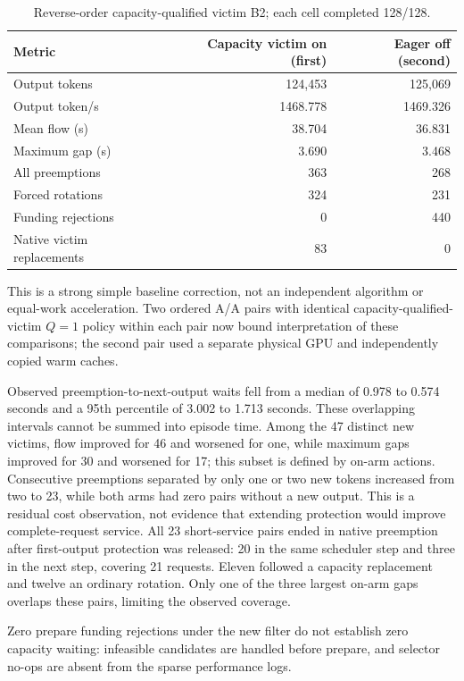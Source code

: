 \documentclass[10pt]{article}
\begin{document}
\begin{table}[t]
\centering\small
\caption{Reverse-order capacity-qualified victim B2; each cell completed 128/128.}
\label{tab:capacityb2}
\begin{tabular}{lrr}
\toprule
Metric & Capacity victim on (first) & Eager off (second) \\
\midrule
Output tokens & 124,453 & 125,069 \\
Output token/s & 1468.778 & 1469.326 \\
Mean flow (s) & 38.704 & 36.831 \\
Maximum gap (s) & 3.690 & 3.468 \\
All preemptions & 363 & 268 \\
Forced rotations & 324 & 231 \\
Funding rejections & 0 & 440 \\
Native victim replacements & 83 & 0 \\
\bottomrule
\end{tabular}
\end{table}

This is a strong simple baseline correction, not an independent algorithm or equal-work acceleration. Two ordered A/A pairs with identical capacity-qualified-victim $Q=1$ policy within each pair now bound interpretation of these comparisons; the second pair used a separate physical GPU and independently copied warm caches.

Observed preemption-to-next-output waits fell from a median of 0.978 to 0.574 seconds and a 95th percentile of 3.002 to 1.713 seconds. These overlapping intervals cannot be summed into episode time. Among the 47 distinct new victims, flow improved for 46 and worsened for one, while maximum gaps improved for 30 and worsened for 17; this subset is defined by on-arm actions. Consecutive preemptions separated by only one or two new tokens increased from two to 23, while both arms had zero pairs without a new output. This is a residual cost observation, not evidence that extending protection would improve complete-request service. All 23 short-service pairs ended in native preemption after first-output protection was released: 20 in the same scheduler step and three in the next step, covering 21 requests. Eleven followed a capacity replacement and twelve an ordinary rotation. Only one of the three largest on-arm gaps overlaps these pairs, limiting the observed coverage.

Zero prepare funding rejections under the new filter do not establish zero capacity waiting: infeasible candidates are handled before prepare, and selector no-ops are absent from the sparse performance logs.
\end{document}
